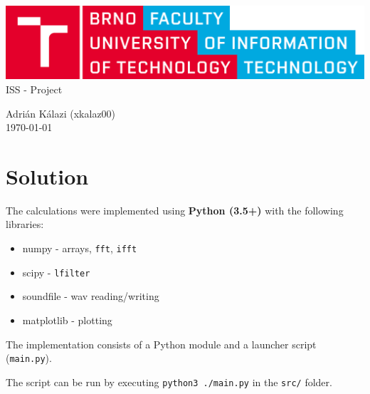 \documentclass[a4paper, 11pt]{article}
\begin{document}
	\begin{center}
	{\includegraphics[width=0.4\linewidth]{fig/logo_en.png}}
		\\
		[0.4cm]

		{\LARGE
		ISS - Project \\
		[0.4cm]
		}

		{\large
		Adrián Kálazi (xkalaz00) \\
		\today
		}
	\end{center}

	\section*{Solution}

	The calculations were implemented using \textbf{Python (3.5+)} with the following libraries:

	\begin{itemize}
		\item numpy - arrays, \texttt{fft}, \texttt{ifft}
		\item scipy - \texttt{lfilter}
		\item soundfile - wav reading/writing
		\item matplotlib - plotting
	\end{itemize}

	The implementation consists of a Python module and a launcher script (\texttt{main.py}).

	The script can be run by executing \texttt{python3 ./main.py} in the \texttt{src/} folder.
\end{document}
